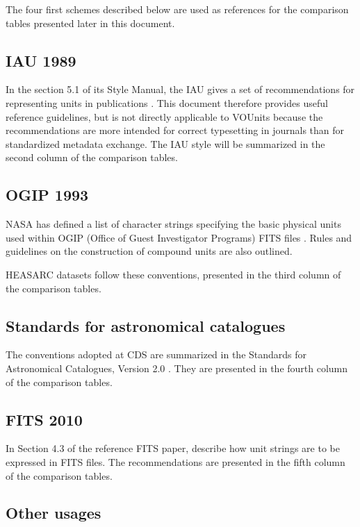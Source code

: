 \documentclass[11pt,notitlepage,onecolumn]{ivoa}
\begin{document}
The four first schemes described below are used as references for the
comparison tables presented later in this document.

\subsection{IAU 1989\label{appx:IAU}}

In the section 5.1 of its Style Manual, the IAU gives a set
of recommendations for representing units in publications \citep{wilkins89}. This document
therefore provides useful reference guidelines, but is not directly
applicable to VOUnits because the recommendations are more intended
for correct typesetting in journals than for standardized metadata exchange.
The IAU style will be summarized in the second column of the comparison tables.

\subsection{OGIP 1993}

NASA has defined a list of character strings specifying the basic physical units 
used within OGIP (Office of Guest Investigator Programs) FITS files \citep{george95}. Rules and guidelines on the construction 
of compound units are also outlined. 

HEASARC datasets follow these conventions, presented in the third column
of the comparison tables.

\subsection{Standards for astronomical catalogues}

The conventions adopted at CDS are summarized in the Standards for Astronomical 
Catalogues, Version 2.0 \citep[\S3.2]{cds00}. They are presented in the fourth column
of the comparison tables.

\subsection{FITS 2010}

In Section 4.3 of the reference FITS paper, \citet{pence10} describe how unit strings are to be expressed in
FITS files. The recommendations are presented in the fifth column
of the comparison tables.

\subsection{Other usages}
\end{document}
